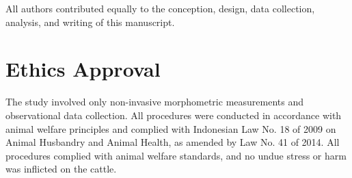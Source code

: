 \documentclass[9pt,article,twoside]{fapet-rho-class/fapet-rho}
\begin{document}
All authors contributed equally to the conception, design, data collection, analysis, and writing of this manuscript.


\section*{Ethics Approval}

The study involved only non-invasive morphometric measurements and observational data collection. All procedures were conducted in accordance with animal welfare principles and complied with Indonesian Law No. 18 of 2009 on Animal Husbandry and Animal Health, as amended by Law No. 41 of 2014. All procedures complied with animal welfare standards, and no undue stress or harm was inflicted on the cattle.





\end{document}
